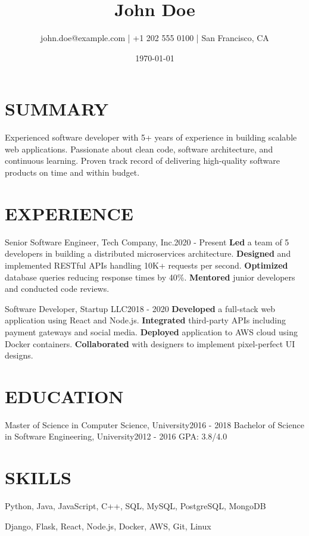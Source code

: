 \documentclass[10pt,a4paper]{article}
\begin{document}
\title{John Doe}
\author{john.doe@example.com | +1 202 555 0100 | San Francisco, CA}
\date{\today}
\maketitle
\vspace{-1cm}

\section{SUMMARY}
Experienced software developer with 5+ years of experience in building scalable web applications. Passionate about clean code, software architecture, and continuous learning. Proven track record of delivering high-quality software products on time and within budget.

\section{EXPERIENCE}
Senior Software Engineer, Tech Company, Inc.\hfill 2020 - Present
\textbf{Led} a team of 5 developers in building a distributed microservices architecture.
\textbf{Designed} and implemented RESTful APIs handling 10K+ requests per second.
\textbf{Optimized} database queries reducing response times by 40\%.
\textbf{Mentored} junior developers and conducted code reviews.

Software Developer, Startup LLC\hfill 2018 - 2020
\textbf{Developed} a full-stack web application using React and Node.js.
\textbf{Integrated} third-party APIs including payment gateways and social media.
\textbf{Deployed} application to AWS cloud using Docker containers.
\textbf{Collaborated} with designers to implement pixel-perfect UI designs.

\section{EDUCATION}
Master of Science in Computer Science, University\hfill 2016 - 2018
Bachelor of Science in Software Engineering, University\hfill 2012 - 2016
GPA: 3.8/4.0

\section{SKILLS}
\begin{description}
\item[\textbf{Programming Languages}] Python, Java, JavaScript, C++, SQL, MySQL, PostgreSQL, MongoDB
\item[\textbf{Frameworks \& Libraries}] Django, Flask, React, Node.js, Docker, AWS, Git, Linux
\end{description}
\end{document}
